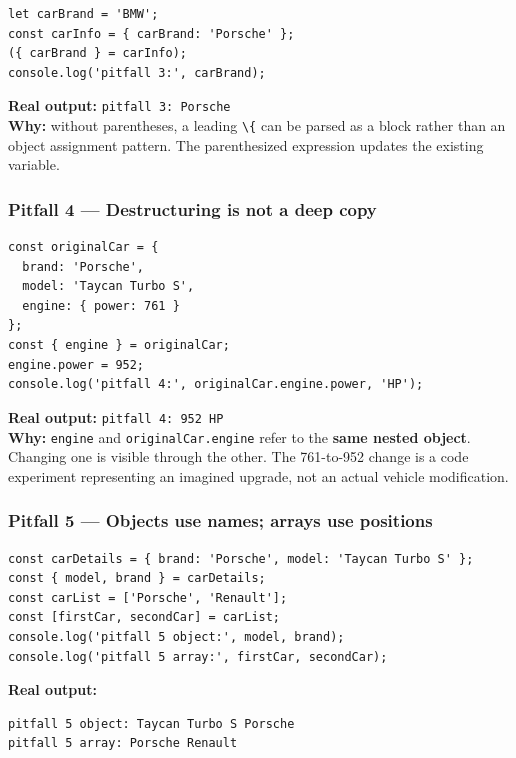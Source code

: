 \documentclass[
  9pt,
]{article}
\newcommand{\passthrough}[1]{#1}
\begin{document}
\begin{lstlisting}
let carBrand = 'BMW';
const carInfo = { carBrand: 'Porsche' };
({ carBrand } = carInfo);
console.log('pitfall 3:', carBrand);
\end{lstlisting}

\textbf{Real output:} \passthrough{\lstinline!pitfall 3: Porsche!}\\
\textbf{Why:} without parentheses, a leading
\passthrough{\lstinline!\{!} can be parsed as a block rather than an
object assignment pattern. The parenthesized expression updates the
existing variable.

\subsubsection{Pitfall 4 --- Destructuring is not a deep
copy}\label{pitfall-4-destructuring-is-not-a-deep-copy}

\begin{lstlisting}
const originalCar = {
  brand: 'Porsche',
  model: 'Taycan Turbo S',
  engine: { power: 761 }
};
const { engine } = originalCar;
engine.power = 952;
console.log('pitfall 4:', originalCar.engine.power, 'HP');
\end{lstlisting}

\textbf{Real output:} \passthrough{\lstinline!pitfall 4: 952 HP!}\\
\textbf{Why:} \passthrough{\lstinline!engine!} and
\passthrough{\lstinline!originalCar.engine!} refer to the \textbf{same
nested object}. Changing one is visible through the other. The
761-to-952 change is a code experiment representing an imagined upgrade,
not an actual vehicle modification.

\subsubsection{Pitfall 5 --- Objects use names; arrays use
positions}\label{pitfall-5-objects-use-names-arrays-use-positions}

\begin{lstlisting}
const carDetails = { brand: 'Porsche', model: 'Taycan Turbo S' };
const { model, brand } = carDetails;
const carList = ['Porsche', 'Renault'];
const [firstCar, secondCar] = carList;
console.log('pitfall 5 object:', model, brand);
console.log('pitfall 5 array:', firstCar, secondCar);
\end{lstlisting}

\textbf{Real output:}

\begin{lstlisting}
pitfall 5 object: Taycan Turbo S Porsche
pitfall 5 array: Porsche Renault
\end{lstlisting}
\end{document}
